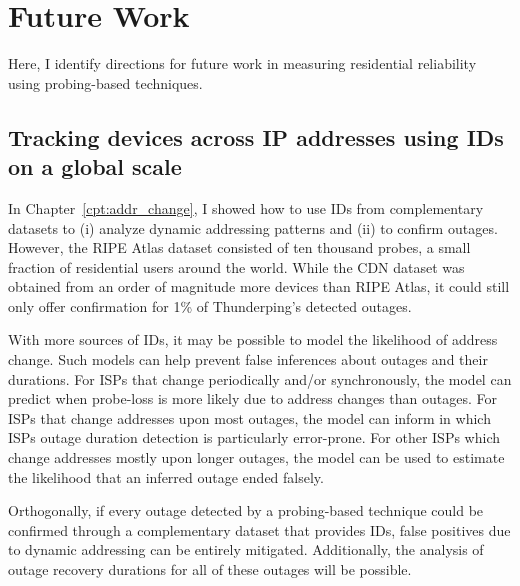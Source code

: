 
\chapter{Future Work}

\label{cpt:future}

Here, I identify directions for future work in measuring residential
reliability using probing-based techniques.

\section{Tracking devices across IP addresses using IDs on a global
scale}


In Chapter~\ref{cpt:addr_change}, I showed how to use IDs from complementary datasets
to (i) analyze dynamic addressing patterns and (ii) to confirm
outages. However, the RIPE Atlas dataset consisted of ten thousand probes, a small fraction of residential users around the world. While the CDN dataset was obtained from an order of magnitude more devices than RIPE Atlas, it
could still only offer confirmation for 1\% of Thunderping's detected outages.

With more sources of IDs, it may be
possible to model the likelihood of
address change. Such models can help prevent false inferences about outages and
their durations. For ISPs that change periodically and/or synchronously, the model can
predict when probe-loss is more likely due to
address changes than outages. For ISPs that change addresses upon most
outages, the model can inform in which ISPs outage duration detection
is particularly error-prone. For other ISPs which change addresses
mostly upon longer outages, the model can be used to estimate the
likelihood that an inferred outage ended falsely.

Orthogonally, if every outage detected by a probing-based technique could be
confirmed through a complementary dataset that provides IDs, false positives due to dynamic addressing can be entirely mitigated. Additionally, the
analysis of outage recovery durations for all of these outages will be
possible. 





